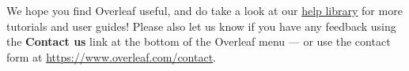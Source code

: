 \documentclass[sigconf]{acmart} %
\begin{document}
\begin{enumerate}
\end{enumerate}

  


We hope you find Overleaf useful, and do take a look at our \href{https://www.overleaf.com/learn}{help library} for more tutorials and user guides! Please also let us know if you have any feedback using the \textbf{Contact us} link at the bottom of the Overleaf menu --- or use the contact form at \url{https://www.overleaf.com/contact}.



\end{document}
